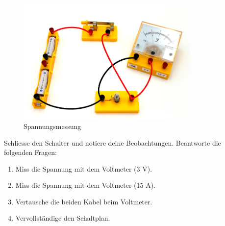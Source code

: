 \begin{figure}[h!]
    \centering
    \includegraphics[width=9cm]{_images/volt_setup.pdf}
    \caption{Spannungsmessung}
    \label{fig:voltage_measurement}
\end{figure}

Schliesse den Schalter und notiere deine Beobachtungen. Beantworte die folgenden Fragen:

\begin{enumerate}
    \item Miss die Spannung mit dem Voltmeter (3 V).
    \item Miss die Spannung mit dem Voltmeter (15 A).
    \item Vertausche die beiden Kabel beim Voltmeter.
    \item Vervollständige den Schaltplan.
\end{enumerate}


